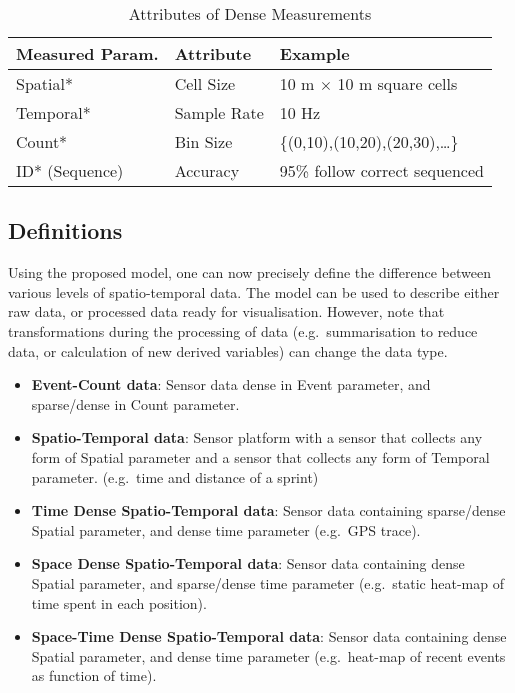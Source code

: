 \begin{table}[h]
\caption{Attributes of Dense Measurements}
\label{tab:regular}
\begin{tabular}{lll}
\toprule
Measured Param. & Attribute & Example\tabularnewline
\midrule
Spatial* & Cell Size & 10 m $\times$ 10 m square cells\tabularnewline
Temporal* & Sample Rate & 10 Hz\tabularnewline
Count* & Bin Size & \{(0,10),(10,20),(20,30),\ldots{}\}\tabularnewline
ID* (Sequence) & Accuracy & 95\% follow correct sequenced\tabularnewline
\bottomrule
\end{tabular}
\end{table}


\subsection{Definitions}\label{definitions}

Using the proposed model, one can now precisely define the difference between various levels of spatio-temporal data. The model can be used to describe either raw data, or processed data ready for visualisation. However, note that transformations during the processing of data
(e.g.~summarisation to reduce data, or calculation of new derived variables) can change the data type.

\begin{itemize}
\item
  \textbf{Event-Count data}: Sensor data dense in Event parameter, and
  sparse/dense in Count parameter.
\item
  \textbf{Spatio-Temporal data}: Sensor platform with a sensor that
  collects any form of Spatial parameter and a sensor that collects any
  form of Temporal parameter. (e.g.~time and distance of a sprint)
\item
  \textbf{Time Dense Spatio-Temporal data}: Sensor data containing
  sparse/dense Spatial parameter, and dense time parameter (e.g.~GPS
  trace).
\item
  \textbf{Space Dense Spatio-Temporal data}: Sensor data containing
  dense Spatial parameter, and sparse/dense time parameter (e.g.~static
  heat-map of time spent in each position).
\item
  \textbf{Space-Time Dense Spatio-Temporal data}: Sensor data containing
  dense Spatial parameter, and dense time parameter (e.g.~heat-map of
  recent events as function of time).
\end{itemize}


